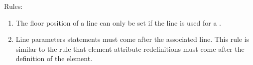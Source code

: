 Rules:
  \begin{enumerate}
  \item
The floor position of a line can only be set if the line is used for a 
 . 
  \item
Line parameters statements must come after the associated line. This
rule is similar to the rule that element attribute redefinitions must
come after the definition of the element.
 \end{enumerate}
